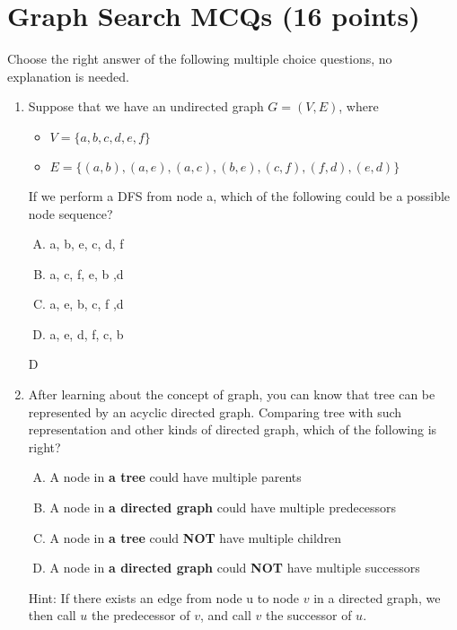 \documentclass[11pt]{exam}
\begin{document}
\section{Graph Search MCQs (16 points)}
Choose the right answer of the following multiple choice questions, no explanation is needed.
\begin{enumerate}
    \item Suppose that we have an undirected graph $G=(V,E)$, where
          \begin{itemize}
              \item $V=\{a,b,c,d,e,f\}$
              \item $E = \{(a, b), (a, e), (a, c), (b, e), (c, f), (f, d), (e, d)\}$
          \end{itemize}
          If we perform a DFS from node a, which of the following could be a possible node sequence?
          \begin{enumerate}[A.]
              \item a, b, e, c, d, f
              \item a, c, f, e, b ,d
              \item a, e, b, c, f ,d
              \item a, e, d, f, c, b
          \end{enumerate}
          \begin{solution}
              D
          \end{solution}
    \item After learning about the concept of graph, you can know that tree can be represented by an acyclic directed graph. Comparing tree with such representation and other kinds of directed graph, which of the following is right?
          \begin{enumerate}[A.]
              \item A node in \textbf{a tree} could have multiple parents
              \item A node in \textbf{a directed graph} could have multiple predecessors
              \item A node in \textbf{a tree} could \textbf{NOT} have multiple children
              \item A node in \textbf{a directed graph} could \textbf{NOT} have multiple successors
          \end{enumerate}
          Hint: If there exists an edge from node u to node $v$ in a directed graph, we then call $u$ the predecessor of $v$, and call $v$ the successor of $u$.

\end{enumerate}
\end{document}
